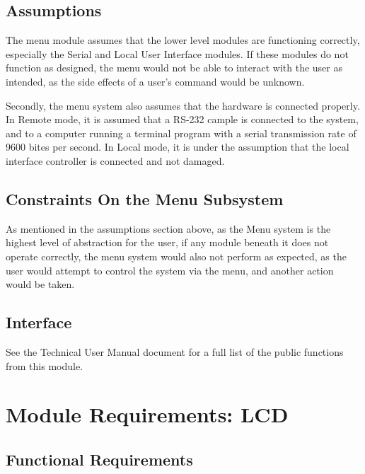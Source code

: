 \documentclass[]{report}
\begin{document}
\subsection{Assumptions}
The menu module assumes that the lower level modules are functioning correctly, especially the Serial and Local User Interface modules. If these modules do not function as designed, the menu would not be able to interact with the user as intended, as the side effects of a user's command would be unknown. 

Secondly, the menu system also assumes that the hardware is connected properly. In Remote mode, it is assumed that a RS-232 cample is connected to the system, and to a computer running a terminal program with a serial transmission rate of 9600 bites per second. In Local mode, it is under the assumption that the local interface controller is connected and not damaged. 

\subsection{Constraints On the Menu Subsystem}
As mentioned in the assumptions section above, as the Menu system is the highest level of abstraction for the user, if any module beneath it does not operate correctly, the menu system would also not perform as expected, as the user would attempt to control the system via the menu, and another action would be taken.

\subsection{Interface}
See the Technical User Manual document for a full list of the public functions from this module.

\section{Module Requirements: LCD}
\subsection{Functional Requirements}
\end{document}
